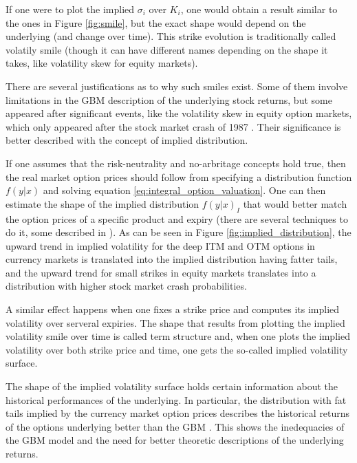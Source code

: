 \documentclass[12,twoside]{mammeTFM}
\theoremstyle{definition}
\theoremstyle{remark}
\begin{document}
If one were to plot the implied $\sigma_i$ over $K_i$, one would obtain a result similar to the ones in Figure \ref{fig:smile}, but the exact shape would depend on the underlying (and change over time). This strike evolution is traditionally called volatily smile (though it can have different names depending on the shape it takes, like volatility skew for equity markets).

There are several justifications as to why such smiles exist. Some of them involve limitations in the GBM description of the underlying stock returns, but some appeared after significant events, like the volatility skew in equity option markets, which only appeared after the stock market crash of 1987 \cite{hul09}. Their significance is better described with the concept of implied distribution.

If one assumes that the risk-neutrality and no-arbritage concepts hold true, then the real market option prices should follow from specifying a distribution function $f(y|x)$ and solving equation \ref{eq:integral_option_valuation}. One can then estimate the shape of the implied distribution $f(y|x)_I$ that would better match the option prices of a specific product and expiry (there are several techniques to do it, some described in \cite{jac96, pea00}). As can be seen in Figure \ref{fig:implied_distribution}, the upward trend in implied volatility for the deep ITM and OTM options in currency markets is translated into the implied distribution having fatter tails, and the upward trend for small strikes in equity markets translates into a distribution with higher stock market crash probabilities.

A similar effect happens when one fixes a strike price and computes its implied volatility over serveral expiries. The shape that results from plotting the implied volatility smile over time is called term structure and, when one plots the implied volatility over both strike price and time, one gets the so-called implied volatility surface.

The shape of the implied volatility surface holds certain information about the historical performances of the underlying. In particular, the distribution with fat tails implied by the currency market option prices describes the historical returns of the options underlying better than the GBM \cite{hul09}. This shows the inedequacies of the GBM model and the need for better theoretic descriptions of the underlying returns.
\end{document}
